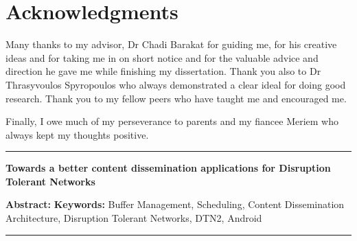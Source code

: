 \documentclass[a4paper,11pt,twoside]{ThesisStyle}
\begin{document}


\dominitoc


 \cleardoublepage

\section*{Acknowledgments}

Many thanks to my advisor, Dr Chadi Barakat for guiding me, for his creative ideas and for taking me in on short notice and for the valuable advice and direction he gave me while finishing my dissertation. Thank you also to Dr Thrasyvoulos Spyropoulos who always demonstrated a clear ideal for doing good research.
Thank you to my fellow peers who have taught me and encouraged me.

Finally, I owe much of my perseverance to parents and my fiancee Meriem who always kept my thoughts positive.

\tableofcontents

\mainmatter









\appendix



%




\cleardoublepage
\begin{vcenterpage}
\noindent\rule[2pt]{\textwidth}{0.5pt}
\begin{center}
{\large\textbf{Towards a better content dissemination applications for Disruption Tolerant Networks\\}}
\end{center}
{\large\textbf{Abstract:}}
{\large\textbf{Keywords:}}
Buffer Management, Scheduling, Content Dissemination Architecture, Disruption Tolerant Networks, DTN2, Android  
\\
\noindent\rule[2pt]{\textwidth}{0.5pt}
\end{vcenterpage}
\end{document}
